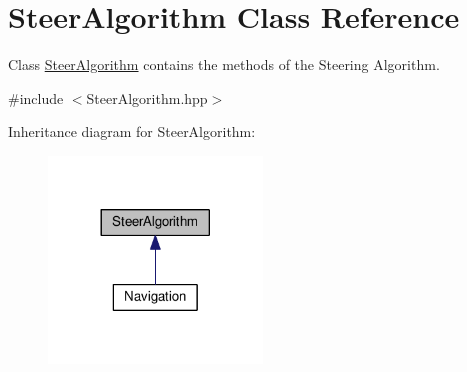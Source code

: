 \hypertarget{class_steer_algorithm}{}\section{Steer\+Algorithm Class Reference}
\label{class_steer_algorithm}


Class \hyperlink{class_steer_algorithm}{Steer\+Algorithm} contains the methods of the Steering Algorithm.  




{\ttfamily \#include $<$Steer\+Algorithm.\+hpp$>$}



Inheritance diagram for Steer\+Algorithm\+:
\nopagebreak
\begin{figure}[H]
\begin{center}
\leavevmode
\includegraphics[width=161pt]{class_steer_algorithm__inherit__graph}
\end{center}
\end{figure}
